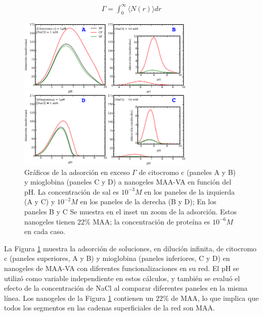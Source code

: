 %
\begin{align}
    \Gamma =  \int_0^\infty{  \langle N(r)\rangle dr}
\end{align}
%



\begin{figure}[!htb]
	\centering
\includegraphics[width=0.75\textwidth]{Figures/graphs-gel2/ad-maa-pH-proteins.pdf}
\caption{Gr\'aficos de la adsorci\'on en exceso $\Gamma$ de citocromo c (paneles A y B) y mioglobina (paneles C y D) a nanogeles MAA-VA en funci\'on del pH.
	La concentraci\'on de sal es $10^{-3}M$ en los paneles de la izquierda (A y C) y $10^{-2}M$ en los paneles de la derecha
	(B y D);  En los paneles B y C Se muestra en el inset un zoom de la adsorci\'on.
	Estos nanogeles tienen 22\% MAA; la concentraci\'on de prote\'ina es $10^{-6}M$ en cada caso.}
\label{fig:esf:adsorption-vs-pH-cyto-myo}
\end{figure}
 
 La Figura \ref{fig:esf:adsorption-vs-pH-cyto-myo} muestra la adsorci\'on de soluciones, en diluci\'on infinita, de citocromo c (paneles superiores, A y B) y mioglobina (paneles inferiores, C y D) en nanogeles de MAA-VA con diferentes funcionalizaciones en su red. El pH se utiliz\'o como variable independiente en estos c\'alculos, y tambi\'en se evalu\'o el efecto de la concentraci\'on de NaCl al comparar diferentes paneles en la misma l\'inea. Los nanogeles de la Figura \ref{fig:esf:adsorption-vs-pH-cyto-myo} contienen un $22\%$ de MAA, lo que implica que todos los segmentos en las cadenas superficiales de la red son MAA.
 
